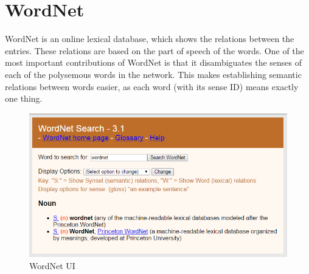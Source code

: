 \documentclass[final, 12pt]{elsarticle}
\begin{document}
\section{WordNet}
\label{sec: wordnet}

WordNet is an online lexical database, which shows the relations between the entries. These relations are based on the part of speech of the words. One of the most important contributions of WordNet is that it disambiguates the senses of each of the polysemous words in the network. This makes establishing semantic relations between words easier, as each word (with its sense ID) means exactly one thing.

\begin{figure}
    \centering
    \includegraphics[width=13.5cm]{WordNet.png}
    \caption{WordNet UI}
    \label{fig: wordnet-ui}
\end{figure}
\end{document}
